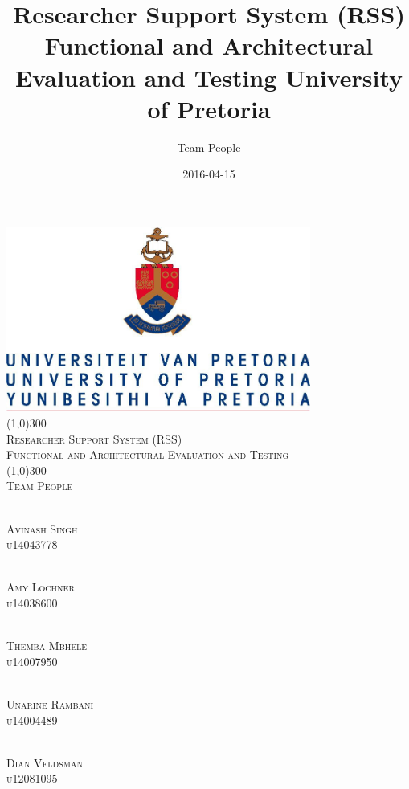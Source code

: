 \documentclass{article}
\title{
Researcher Support System (RSS)
Functional and Architectural Evaluation and Testing
University of Pretoria\\}
\date{2016-04-15}
\author{\huge Team People }
\begin{document}
\begin{titlepage}
	\begin{center}
		\includegraphics[width=10cm]{UP.jpg}  \\
		[1cm]
		\line(1,0){300} \\
		[0.3cm]
		\textsc{\Large
			Researcher Support System (RSS)\\
			Functional and Architectural Evaluation and Testing
		}\\
		[0.1cm]
		\line(1,0){300} \\
		[0.7cm]
		\textsc{\Large
			Team People
		} \\



	\end{center}

	\begin{center}
	\begin{multicols}{2}
	\textsc{\large\\
		Avinash Singh\\ 
		u14043778\\ 
	}
	
	\textsc{\large\\
		Amy Lochner\\
		u14038600\\ 
	}
	
	\textsc{\large\\
		Themba Mbhele\\
		u14007950\\ 
	}

	\textsc{\large\\
		Unarine Rambani\\
		u14004489 \\
	}
	
	\textsc{\large\\
		Dian Veldsman\\
		u12081095\\
	}
	

\end{multicols}
\end{center}
\end{titlepage}
\end{document}
